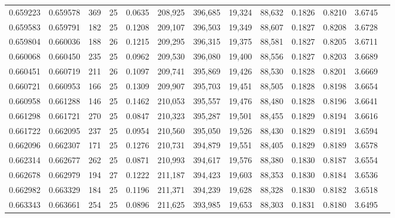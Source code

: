 \begin{tabular}{rrrrrrrrrrrrr}
0.659223 & 0.659578 &   369 &  25 &                                     0.0635 & 208,925 & 396,685 &  19,324 &  88,632 & 0.1826 & 0.8210 & 3.6745 \\
0.659583 & 0.659791 &   182 &  25 &                                     0.1208 & 209,107 & 396,503 &  19,349 &  88,607 & 0.1827 & 0.8208 & 3.6728 \\
0.659804 & 0.660036 &   188 &  26 &                                     0.1215 & 209,295 & 396,315 &  19,375 &  88,581 & 0.1827 & 0.8205 & 3.6711 \\
0.660068 & 0.660450 &   235 &  25 &                                     0.0962 & 209,530 & 396,080 &  19,400 &  88,556 & 0.1827 & 0.8203 & 3.6689 \\
0.660451 & 0.660719 &   211 &  26 &                                     0.1097 & 209,741 & 395,869 &  19,426 &  88,530 & 0.1828 & 0.8201 & 3.6669 \\
0.660721 & 0.660953 &   166 &  25 &                                     0.1309 & 209,907 & 395,703 &  19,451 &  88,505 & 0.1828 & 0.8198 & 3.6654 \\
0.660958 & 0.661288 &   146 &  25 &                                     0.1462 & 210,053 & 395,557 &  19,476 &  88,480 & 0.1828 & 0.8196 & 3.6641 \\
0.661298 & 0.661721 &   270 &  25 &                                     0.0847 & 210,323 & 395,287 &  19,501 &  88,455 & 0.1829 & 0.8194 & 3.6616 \\
0.661722 & 0.662095 &   237 &  25 &                                     0.0954 & 210,560 & 395,050 &  19,526 &  88,430 & 0.1829 & 0.8191 & 3.6594 \\
0.662096 & 0.662307 &   171 &  25 &                                     0.1276 & 210,731 & 394,879 &  19,551 &  88,405 & 0.1829 & 0.8189 & 3.6578 \\
0.662314 & 0.662677 &   262 &  25 &                                     0.0871 & 210,993 & 394,617 &  19,576 &  88,380 & 0.1830 & 0.8187 & 3.6554 \\
0.662678 & 0.662979 &   194 &  27 &                                     0.1222 & 211,187 & 394,423 &  19,603 &  88,353 & 0.1830 & 0.8184 & 3.6536 \\
0.662982 & 0.663329 &   184 &  25 &                                     0.1196 & 211,371 & 394,239 &  19,628 &  88,328 & 0.1830 & 0.8182 & 3.6518 \\
0.663343 & 0.663661 &   254 &  25 &                                     0.0896 & 211,625 & 393,985 &  19,653 &  88,303 & 0.1831 & 0.8180 & 3.6495 \\

\end{tabular}
